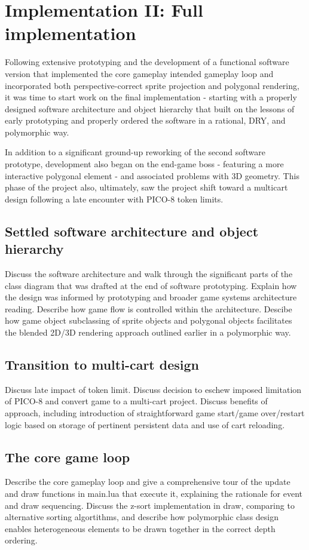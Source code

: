 \documentclass{article}
\begin{document}
\section{Implementation II: Full implementation}

Following extensive prototyping and the development of a functional software version that
implemented the core gameplay intended gameplay loop and incorporated both
perspective-correct sprite projection and polygonal rendering, it was time to start work on
the final implementation - starting with a properly designed software architecture and object
hierarchy that built on the lessons of early prototyping and properly ordered the software in
a rational, DRY, and polymorphic way.

In addition to a significant ground-up reworking of the second software prototype, development
also began on the end-game boss - featuring a more interactive polygonal element - and associated
problems with 3D geometry. This phase of the project also, ultimately, saw the project shift toward
a multicart design following a late encounter with PICO-8 token limits.

\subsection{Settled software architecture and object hierarchy}
Discuss the software architecture and walk through the significant parts of the
class diagram that was drafted at the end of software prototyping. Explain how the
design was informed by prototyping and broader game systems architecture reading.
Describe how game flow is controlled within the architecture. Descibe how game object
subclassing of sprite objects and polygonal objects facilitates the blended
2D/3D rendering approach outlined earlier in a polymorphic way. 

\subsection{Transition to multi-cart design}
Discuss late impact of token limit. Discuss decision to eschew imposed limitation of
PICO-8 and convert game to a multi-cart project. Discuss benefits of approach, including
introduction of straightforward game start/game over/restart logic based on storage of
pertinent persistent data and use of cart reloading. 

\subsection{The core game loop}
Describe the core gameplay loop and give a comprehensive tour of the update and draw
functions in main.lua that execute it, explaining the rationale for event and draw
sequencing. Discuss the z-sort implementation in draw, comparing to alternative sorting
algortithms, and describe how polymorphic class design enables heterogeneous elements
to be drawn together in the correct depth ordering.
\end{document}
